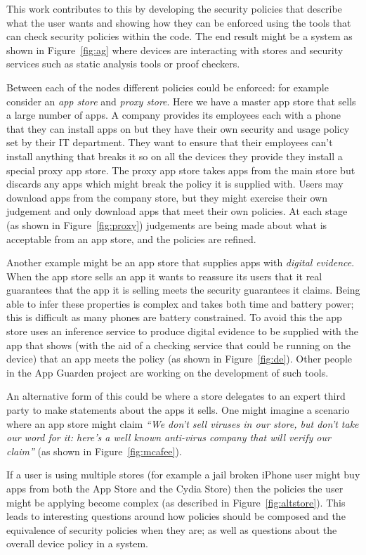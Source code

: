 \documentclass[a4paper,sfsidenotes]{tufte-book}
\begin{document}
This work contributes to this by developing the security policies that describe
what the user wants and showing how they can be enforced using the tools that
can check security policies within the code.  The end result might be a system
as shown in Figure~\ref{fig:ag} where devices are interacting with stores and
security services such as static analysis tools or proof checkers. 

Between each of the nodes different policies could be enforced: for example
consider an \emph{app store} and \emph{proxy store}.  Here we have a master app
store that sells a large number of apps.  A company provides its employees each
with a phone that they can install apps on but they have their own security
and usage policy set by their IT department.  They want to ensure that their
employees can't install anything that breaks it so on all the devices they
provide they install a special proxy app store.  The proxy app store takes apps
from the main store but discards any apps which might break the policy it is
supplied with.  Users may download apps from the company store, but they might
exercise their own judgement and only download apps that meet their own
policies.  At each stage (as shown in Figure~\ref{fig:proxy})
judgements are being made about what is acceptable from an app store, and the
policies are refined.

Another example might be an app store that supplies apps with \emph{digital
evidence}.  When the app store sells an app it wants to reassure its users that
it real guarantees that the app it is selling meets the security guarantees it
claims.  Being able to infer these properties is complex and takes both time and
battery power; this is difficult as many phones are battery constrained.  To
avoid this the app store uses an inference service to produce digital evidence
to be supplied with the app that shows (with the aid of a checking service that
could be running on the device) that an app meets the policy (as shown in
Figure~\ref{fig:de}). Other people in the App Guarden project are working on the
development of such tools.

An alternative form of this could be where a store delegates to an expert third
party to make statements about the apps it sells.  One might imagine a scenario
where an app store might claim \emph{``We don't sell viruses in our store, but
don't take our word for it: here's a well known anti-virus company that will
verify our claim''} (as shown in Figure~\ref{fig:mcafee}).

If a user is using multiple stores (for example a jail broken iPhone user might
buy apps from both the App Store and the Cydia Store) then the policies the user
might be applying become complex (as described in Figure~\ref{fig:altstore}).
This leads to interesting questions around how policies should be composed and
the equivalence of security policies when they are; as well as questions about
the overall device policy in a system.
\end{document}
